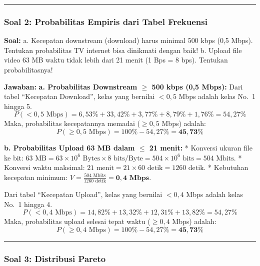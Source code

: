 \documentclass[
  letterpaper,
  DIV=11,
  numbers=noendperiod]{scrartcl}
\begin{document}
\begin{center}\rule{0.5\linewidth}{0.5pt}\end{center}

\subsubsection{\texorpdfstring{\textbf{Soal 2: Probabilitas Empiris dari
Tabel
Frekuensi}}{Soal 2: Probabilitas Empiris dari Tabel Frekuensi}}\label{soal-2-probabilitas-empiris-dari-tabel-frekuensi}

\textbf{Soal:} a. Kecepatan downstream (download) harus minimal 500 kbps
(0,5 Mbps). Tentukan probabilitas TV internet bisa dinikmati dengan
baik! b. Upload file video 63 MB waktu tidak lebih dari 21 menit (1 Bps
= 8 bps). Tentukan probabilitasnya!

\textbf{Jawaban:} \textbf{a. Probabilitas Downstream \(\ge\) 500 kbps
(0,5 Mbps):} Dari tabel ``Kecepatan Download'', kelas yang bernilai
\(< 0,5\) Mbps adalah kelas No.~1 hingga 5.
\[ P(< 0,5 \text{ Mbps}) = 6,53\% + 33,42\% + 3,77\% + 8,79\% + 1,76\% = 54,27\% \]
Maka, probabilitas kecepatannya memadai (\(\ge 0,5\) Mbps) adalah:
\[ P(\ge 0,5 \text{ Mbps}) = 100\% - 54,27\% = \mathbf{45,73\%} \]

\textbf{b. Probabilitas Upload 63 MB dalam \(\le\) 21 menit:} * Konversi
ukuran file ke bit:
\(63 \text{ MB} = 63 \times 10^6 \text{ Bytes} \times 8 \text{ bits/Byte} = 504 \times 10^6 \text{ bits} = 504 \text{ Mbits}\).
* Konversi waktu maksimal:
\(21 \text{ menit} = 21 \times 60 \text{ detik} = 1260 \text{ detik}\).
* Kebutuhan kecepatan minimum:
\(V = \frac{504 \text{ Mbits}}{1260 \text{ detik}} = \mathbf{0,4 \text{ Mbps}}\).

Dari tabel ``Kecepatan Upload'', kelas yang bernilai \(< 0,4\) Mbps
adalah kelas No.~1 hingga 4.
\[ P(< 0,4 \text{ Mbps}) = 14,82\% + 13,32\% + 12,31\% + 13,82\% = 54,27\% \]
Maka, probabilitas upload selesai tepat waktu (\(\ge 0,4\) Mbps) adalah:
\[ P(\ge 0,4 \text{ Mbps}) = 100\% - 54,27\% = \mathbf{45,73\%} \]

\begin{center}\rule{0.5\linewidth}{0.5pt}\end{center}

\subsubsection{\texorpdfstring{\textbf{Soal 3: Distribusi
Pareto}}{Soal 3: Distribusi Pareto}}\label{soal-3-distribusi-pareto}
\end{document}
